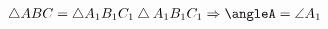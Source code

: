 \documentclass[preview]{standalone}
\begin{document}
\begin{align*}
\bigtriangleup ABC = \bigtriangleup A_1 B_1 C_1\bigtriangleup A_1 B_1 C_1\Rightarrow \angleA = \angle A_1
\end{align*}
\end{document}
